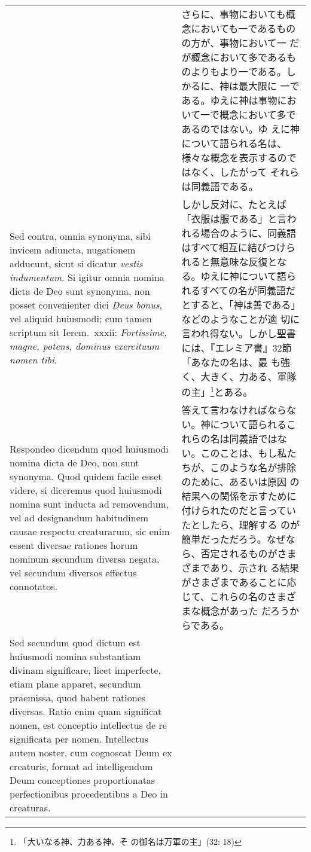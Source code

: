 \documentclass[10pt]{jsarticle}
\begin{document}
\begin{longtable}{p{21em}p{21em}}
&

さらに、事物においても概念においても一であるものの方が、事物において一
だが概念において多であるものよりもより一である。しかるに、神は最大限に
一である。ゆえに神は事物において一で概念において多であるのではない。ゆ
えに神について語られる名は、様々な概念を表示するのではなく、したがって
それらは同義語である。

\\

{\sc Sed contra}, omnia synonyma, sibi invicem adiuncta, nugationem
adducunt, sicut si dicatur {\it vestis indumentum}. Si igitur omnia
nomina dicta de Deo sunt synonyma, non posset convenienter dici {\it
Deus bonus}, vel aliquid huiusmodi; cum tamen scriptum sit Ierem.\
{\sc xxxii}: {\it Fortissime, magne, potens, dominus exercituum nomen
tibi}.

&

しかし反対に、たとえば「衣服は服である」と言われる場合のように、同義語
はすべて相互に結びつけられると無意味な反復となる。ゆえに神について語ら
れるすべての名が同義語だとすると、「神は善である」などのようなことが適
切に言われ得ない。しかし聖書には、『エレミア書』32節「あなたの名は、最
も強く、大きく、力ある、軍隊の主」\footnote{「大いなる神、力ある神、そ
の御名は万軍の主」(32: 18)}とある。

\\

{\sc Respondeo dicendum} quod huiusmodi nomina dicta de Deo, non sunt
synonyma. Quod quidem facile esset videre, si diceremus quod huiusmodi
nomina sunt inducta ad removendum, vel ad designandum habitudinem
causae respectu creaturarum, sic enim essent diversae rationes horum
nominum secundum diversa negata, vel secundum diversos effectus
connotatos.

&

答えて言わなければならない。神について語られるこれらの名は同義語ではな
い。このことは、もし私たちが、このような名が排除のために、あるいは原因
の結果への関係を示すために付けられたのだと言っていたとしたら、理解する
のが簡単だっただろう。なぜなら、否定されるものがさまざまであり、示され
る結果がさまざまであることに応じて、これらの名のさまざまな概念があった
だろうからである。

\\

Sed secundum quod dictum est huiusmodi nomina substantiam divinam
significare, licet imperfecte, etiam plane apparet, secundum
praemissa, quod habent rationes diversas. Ratio enim quam significat
nomen, est conceptio intellectus de re significata per
nomen. Intellectus autem noster, cum cognoscat Deum ex creaturis,
format ad intelligendum Deum conceptiones proportionatas
perfectionibus procedentibus a Deo in creaturas.


\end{longtable}
\end{document}
